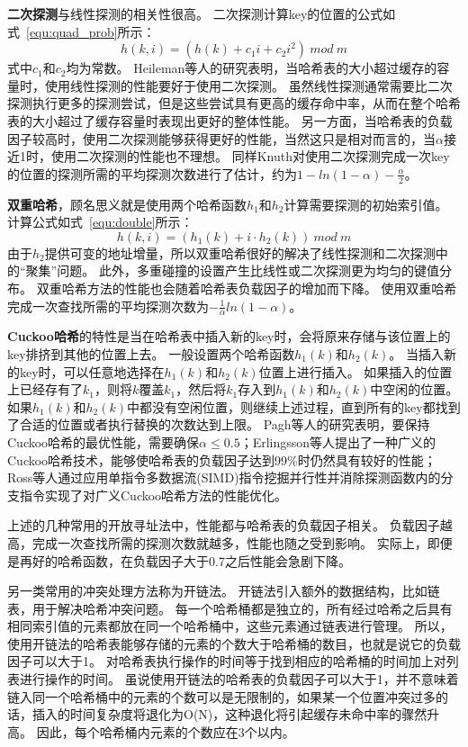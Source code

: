 \textbf{二次探测}与线性探测的相关性很高。
二次探测计算key的位置的公式如式~\ref{equ:quad_prob}所示：
\begin{equation}
h(k,i) = (h(k)+c_1 i+c_2i^2)~{mod}~m
\label{equ:quad_prob}
\end{equation}
式中$c_1$和$c_2$均为常数。
Heileman等人的研究表明，当哈希表的大小超过缓存的容量时，使用线性探测的性能要好于使用二次探测\cite{heileman2005caching}。
虽然线性探测通常需要比二次探测执行更多的探测尝试，但是这些尝试具有更高的缓存命中率，从而在整个哈希表的大小超过了缓存容量时表现出更好的整体性能。
另一方面，当哈希表的负载因子较高时，使用二次探测能够获得更好的性能，当然这只是相对而言的，当$\alpha$接近1时，使用二次探测的性能也不理想。
同样Knuth对使用二次探测完成一次key的位置的探测所需的平均探测次数进行了估计，约为$1-ln(1-\alpha)-\frac{\alpha}{2}$。

\textbf{双重哈希}，顾名思义就是使用两个哈希函数$h_1$和$h_2$计算需要探测的初始索引值。
计算公式如式~\ref{equ:double}所示：
\begin{equation}
h(k,i) = (h_1(k)+i\cdot h_2(k)) ~{mod}~m
\label{equ:double}
\end{equation}
由于$h_2$提供可变的地址增量，所以双重哈希很好的解决了线性探测和二次探测中的“聚集”问题。
此外，多重碰撞的设置产生比线性或二次探测更为均匀的键值分布。
双重哈希方法的性能也会随着哈希表负载因子的增加而下降。
使用双重哈希完成一次查找所需的平均探测次数为$-\frac{1}{\alpha}ln(1-\alpha)$。

\textbf{Cuckoo哈希}的特性是当在哈希表中插入新的key时，会将原来存储与该位置上的key排挤到其他的位置上去。
一般设置两个哈希函数$h_1(k)$和$h_2(k)$。
当插入新的key时，可以任意地选择在$h_1(k)$和$h_2(k)$位置上进行插入。
如果插入的位置上已经存有了$k_1$，则将$k$覆盖$k_1$，然后将$k_1$存入到$h_1(k)$和$h_2(k)$中空闲的位置。
如果$h_1(k)$和$h_2(k)$中都没有空闲位置，则继续上述过程，直到所有的key都找到了合适的位置或者执行替换的次数达到上限\cite{pagh2004cuckoo,erlingsson2006cool}。
Pagh等人的研究表明，要保持Cuckoo哈希的最优性能，需要确保$\alpha\leq 0.5$\cite{pagh2004cuckoo}；Erlingsson等人提出了一种广义的Cuckoo哈希技术\cite{erlingsson2006cool}，能够使哈希表的负载因子达到99\%时仍然具有较好的性能；
Ross等人通过应用单指令多数据流(SIMD)指令挖掘并行性并消除探测函数内的分支指令实现了对广义Cuckoo哈希方法的性能优化\cite{ross2007efficient}。

上述的几种常用的开放寻址法中，性能都与哈希表的负载因子相关。
负载因子越高，完成一次查找所需的探测次数就越多，性能也随之受到影响。
实际上，即便是再好的哈希函数，在负载因子大于0.7之后性能会急剧下降。

另一类常用的冲突处理方法称为开链法。
开链法引入额外的数据结构，比如链表，用于解决哈希冲突问题。
每一个哈希桶都是独立的，所有经过哈希之后具有相同索引值的元素都放在同一个哈希桶中，这些元素通过链表进行管理。
所以，使用开链法的哈希表能够存储的元素的个数大于哈希桶的数目，也就是说它的负载因子可以大于1。
对哈希表执行操作的时间等于找到相应的哈希桶的时间加上对列表进行操作的时间。
虽说使用开链法的哈希表的负载因子可以大于1，并不意味着链入同一个哈希桶中的元素的个数可以是无限制的，如果某一个位置冲突过多的话，插入的时间复杂度将退化为O(N)，这种退化将引起缓存未命中率的骤然升高\cite{black1998graph}。
因此，每个哈希桶内元素的个数应在3个以内。

